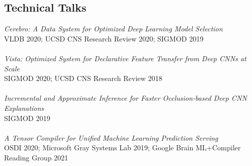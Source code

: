 \documentclass[margin]{res}
\begin{document}
\begin{resume}
\section{Technical Talks}
\textit{Cerebro: A Data System for Optimized Deep Learning Model Selection}\\ VLDB 2020; UCSD CNS Research Review 2020; SIGMOD 2019\\\\
\textit{Vista: Optimized System for Declarative Feature Transfer from Deep CNNs at Scale}\\ SIGMOD 2020; UCSD CNS Research Review 2018\\\\
\textit{Incremental and Approximate Inference for Faster Occlusion-based Deep CNN Explanations}\\ SIGMOD 2019\\\\
\textit{A Tensor Compiler for Unified Machine Learning Prediction Serving}\\ OSDI 2020; Microsoft Gray Systems Lab 2019; Google Brain ML+Compiler Reading Group 2021\\



\end{resume}
\end{document}
